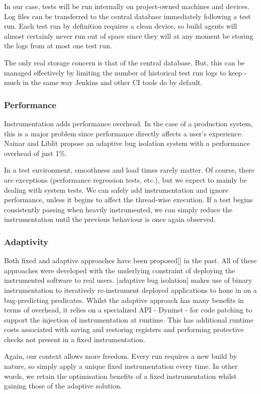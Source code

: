 In our case, tests will be run internally on project-owned machines and devices. Log files can be transferred to the central database immediately following a test run. Each test run by definition requires a clean device, so build agents will almost certainly never run out of space since they will at any moment be storing the logs from at most one test run.

The only real storage concern is that of the central database. But, this can be managed effectively by limiting the number of historical test run logs to keep - much in the same way Jenkins and other CI tools do by default.


\subsubsection{Performance}

Instrumentation adds performance overhead. In the case of a production system, this is a major problem since performance directly affects a user’s experience. Nainar and Liblit \cite{ArumugaNainar:2010:ABI:1806799.1806839} propose an adaptive bug isolation system with a performance overhead of just 1\%.

In a test environment, smoothness and load times rarely matter. Of course, there are exceptions (performance regression tests, etc.), but we expect to mainly be dealing with system tests. We can safely add instrumentation and ignore performance, unless it begins to affect the thread-wise execution. If a \flaky{} test begins consistently passing when heavily instrumented, we can simply reduce the instrumentation until the previous \flaky{} behaviour is once again observed.

\subsubsection{Adaptivity}

Both fixed and adaptive approaches have been proposed[] in the past. All of these approaches were developed with the underlying constraint of deploying the instrumented software to real users. [adaptive bug isolation] makes use of binary instrumentation to iteratively re-instrument deployed applications to hone in on a bug-predicting predicates. Whilst the adaptive approach has many benefits in terms of overhead, it relies on a specialized API - Dyninst - for code patching to support the injection of  instrumentation at runtime. This has additional runtime costs \cite{DyninstGuide} associated with saving and restoring registers and performing protective checks not present in a fixed instrumentation.

Again, our context allows more freedom. Every run requires a new build by nature, so simply apply a unique fixed instrumentation every time. In other words, we retain the optimisation benefits of a fixed instrumentation whilst gaining those of the adaptive solution.
